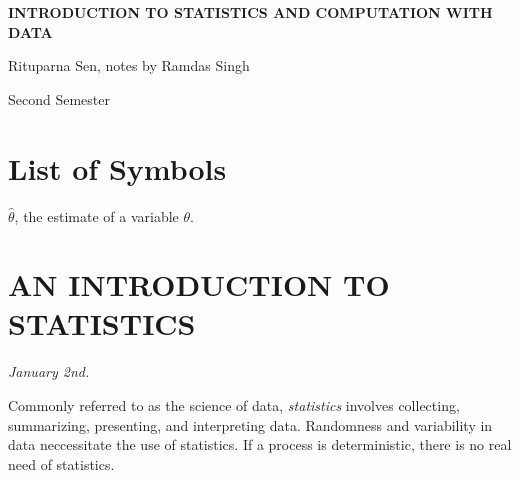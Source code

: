 \documentclass[15pt,a4paper]{book}
\theoremstyle{definition}
\newcommand{\eax}[1]{\emph{#1}\index{#1}} %
\begin{document}
\pagestyle{empty}

\begin{titlepage}
    \begin{center}
    \vspace*{\fill}
    {\Huge \textbf{\MakeUppercase{Introduction to Statistics and Computation with Data}}\par}

    \vspace{0.5cm} %
    {\Large Rituparna Sen, notes by Ramdas Singh\par}

    \vspace{0.5cm} %
    {\large Second Semester\par}
    \vspace*{\fill}
    \end{center}
\end{titlepage}

\clearpage


\chapter*{List of Symbols}
\begin{notationlist}
    \item $\hat{\theta}$, the estimate of a variable $\theta$.
\end{notationlist}

\newpage
\setcounter{tocdepth}{2}
\tableofcontents

\newpage
{}
\pagestyle{fancy}




\chapter{AN INTRODUCTION TO STATISTICS}

\textit{January 2nd.}

Commonly referred to as the science of data, \eax{statistics} involves collecting, summarizing, presenting, and interpreting data. Randomness and variability in data neccessitate the use of statistics. If a process is deterministic, there is no real need of statistics.
\end{document}
